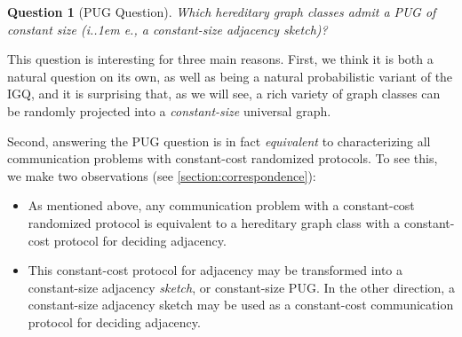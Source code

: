\documentclass{article}
\makeatletter
\newtheorem{question}[theorem]{Question}
\newcommand*\ie{i.\kern.1em e.\@\xspace} %
\makeatother
\begin{document}
\begin{question}[PUG Question]
\label{question:main} Which hereditary graph classes admit a PUG of constant size (\ie, a
constant-size adjacency sketch)?
\end{question}

This question is interesting for three main reasons. First, we think it is both a natural question
on its own, as well as being a natural probabilistic variant of the IGQ, and it is surprising that,
as we will see, a rich variety of graph classes can be randomly projected into a
\emph{constant-size} universal graph.

Second, answering the PUG question is in fact \emph{equivalent} to characterizing all communication
problems with constant-cost randomized protocols. To see this, we make two observations (see
\cref{section:correspondence}):
\begin{itemize}
\item As mentioned above, any communication problem with a constant-cost randomized protocol is
equivalent to a hereditary graph class with a constant-cost protocol for deciding adjacency.
\item This constant-cost protocol for adjacency may be transformed into a constant-size adjacency
\emph{sketch}, or constant-size PUG. In the other direction, a constant-size
adjacency sketch may be used as a constant-cost communication protocol for deciding adjacency.
\end{itemize}
\end{document}
